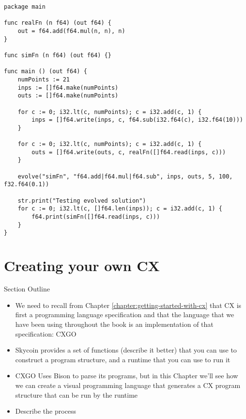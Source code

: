 \documentclass[11pt,fleqn,openany]{book} %
\begin{document}
\begin{lstlisting}[caption={Using Genetic Programming to Evolve a Function},captionpos=b,label={listing:genetic-programming-example}]
package main

func realFn (n f64) (out f64) {
	out = f64.add(f64.mul(n, n), n)
}

func simFn (n f64) (out f64) {}

func main () (out f64) {
	numPoints := 21
	inps := []f64.make(numPoints)
	outs := []f64.make(numPoints)
	
	for c := 0; i32.lt(c, numPoints); c = i32.add(c, 1) {
		inps = []f64.write(inps, c, f64.sub(i32.f64(c), i32.f64(10)))
	}

	for c := 0; i32.lt(c, numPoints); c = i32.add(c, 1) {
		outs = []f64.write(outs, c, realFn([]f64.read(inps, c)))
	}
	
	evolve("simFn", "f64.add|f64.mul|f64.sub", inps, outs, 5, 100, f32.f64(0.1))

	str.print("Testing evolved solution")
	for c := 0; i32.lt(c, []f64.len(inps)); c = i32.add(c, 1) {
		f64.print(simFn([]f64.read(inps, c)))
	}
}
\end{lstlisting}


\chapter{Creating your own CX}
\label{chapter:creating-your-own-cx}

\begin{remark}
Section Outline
    \begin{itemize}
    \item We need to recall from Chapter \ref{chapter:getting-started-with-cx} that CX is first a programming language specification and that the language that we have been using throughout the book is an implementation of that specification: CXGO
    \item Skycoin provides a set of functions (describe it better) that you can use to construct a program structure, and a runtime that you can use to run it
    \item CXGO Uses Bison to parse its programs, but in this Chapter we'll see how we can create a visual programming language that generates a CX program structure that can be run by the runtime
    \item Describe the process
    \end{itemize}
\end{remark}
\end{document}
